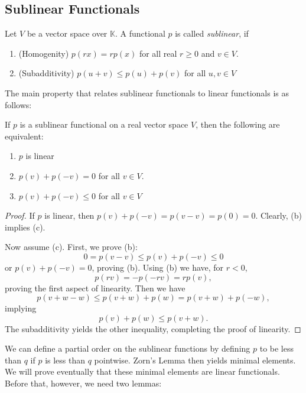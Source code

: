 \documentclass[twoside,symmetric, openany, 12pt]{./tuftebook}
\theoremstyle{definition}
\theoremstyle{definition}
\theoremstyle{definition}
\newenvironment{parts}{\begin{enumerate}[label=(\alph*)]}{\end{enumerate}}
\begin{document}
	\subsection{Sublinear Functionals}
	\begin{Definition}
		Let $V$ be a vector space over $\mathbb{K}$. A functional $p$ is called \emph{sublinear}, if
		\begin{parts}
			\item (Homogenity) $p(rx)=rp(x)$ for all real $r\ge 0$ and $v\in V$.
			\item (Subadditivity) $p(u+v)\le p(u)+p(v)$ for all $u,v\in V$
		\end{parts}
	\end{Definition}
The main property that relates sublinear functionals to linear functionals is as follows:
\begin{Theorem}
	If $p$ is a sublinear functional on a real vector space $V$, then the following are equivalent:
	\begin{parts}
	\item $p$ is linear
	\item $p(v)+p(-v)=0$ for all $v\in V$.
	\item $p(v)+p(-v)\le 0$ for all $v\in V$
	\end{parts}
\end{Theorem}
\begin{proof}
	If $p$ is linear, then $p(v)+p(-v)=p(v-v)=p(0)=0$. Clearly, (b) implies (c).

	Now assume (c). First, we prove (b):
	\[
	0=p(v-v)\le p(v)+p(-v) \le 0
	\]
	or $p(v)+p(-v)=0$, proving (b). Using (b) we have, for $r<0$,
	\[
	p(rv)=-p(-rv)=rp(v)
	,\]
	proving the first aspect of linearity. Then we have
	\[
	p(v+w-w)\le p(v+w)+p(w)=p(v+w)+p(-w)
	,\]
	implying
	\[
	p(v)+p(w)\le p(v+w)
	.\] 
	The subadditivity yields the other inequality, completing the proof of linearity.
\end{proof}

We can define a partial order on the sublinear functions by defining $p$ to be less than $q$ if $p$ is less than $q$ pointwise. Zorn's Lemma then yields minimal elements. We will prove eventually that these minimal elements are linear functionals. Before that, however, we need two lemmas:
\end{document}
